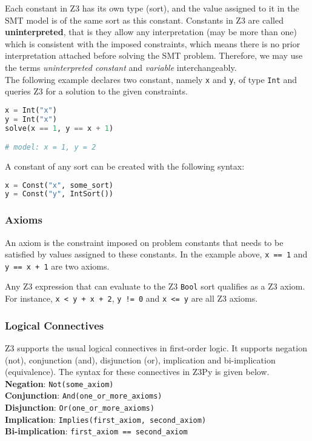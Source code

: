 Each constant in Z3 has its own type (sort), and the value assigned to it in the SMT model is of the same sort as this constant. Constants in Z3 are called \textbf{uninterpreted}, that is they allow any interpretation (may be more than one) which is consistent with the imposed constraints, which means there is no prior interpretation attached before solving the SMT problem. Therefore, we may use the terms \textit{uninterpreted constant} and \textit{variable} interchangeably. \\

The following example declares two constant, namely \lstinline|x| and \lstinline|y|, of type \lstinline|Int| and queries Z3 for a solution to the given constraints.

\begin{lstlisting}[language=python]
x = Int("x")
y = Int("x")
solve(x == 1, y == x + 1)

# model: x = 1, y = 2
\end{lstlisting}

A constant of any sort can be created with the following syntax:

\begin{lstlisting}[language=python]
x = Const("x", some_sort)
y = Const("y", IntSort())
\end{lstlisting}

\subsubsection{Axioms}
An axiom is the constraint imposed on problem constants that needs to be satisfied by values assigned to these constants. In the example above, \lstinline|x == 1| and \lstinline|y == x + 1| are two axioms.

Any Z3 expression that can evaluate to the Z3 \lstinline|Bool| sort qualifies as a Z3 axiom. For instance, \lstinline|x < y + x + 2|, \lstinline|y != 0| and \lstinline|x <= y| are all Z3 axioms.


\subsubsection{Logical Connectives}
Z3 supports the usual logical connectives in first-order logic. It supports negation (not), conjunction (and), disjunction (or), implication and bi-implication (equivalence). The syntax for these connectives in Z3Py is given below.\\
\textbf{Negation}: \lstinline|Not(some_axiom)|\\
\textbf{Conjunction}: \lstinline|And(one_or_more_axioms)|\\
\textbf{Disjunction}: \lstinline|Or(one_or_more_axioms)|\\
\textbf{Implication}: \lstinline|Implies(first_axiom, second_axiom)|\\
\textbf{Bi-implication}: \lstinline|first_axiom == second_axiom|\\


